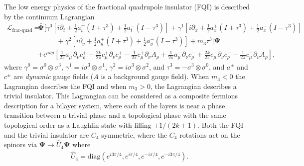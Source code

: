 \documentclass[%
 reprint,
 amsmath,amssymb,
 aps,
]{revtex4-1}
\begin{document}
\begin{appendix}
The low energy physics of the fractional quadrupole insulator (FQI) is described by the continuum Lagrangian 
\begin{equation}\begin{split}
\mathcal{L}_{\text{frac-quad}} = &\bar{\bm{\Psi}} \Big[\gamma^0 [i\partial_t + \frac{1}{2}a^+_t(I + \tau^3) + \frac{1}{2}a^-_t(I - \tau^3)]  + \gamma^1 [i\partial_x + \frac{1}{2}a^+_x(I + \tau^3) + \frac{1}{2}a^-_x(I - \tau^3)]  \\ &\phantom{==}+ \gamma^2 [i\partial_y + \frac{1}{2}a^+_y(I + \tau^3) + \frac{1}{2}a^-_y(I - \tau^3)] + m_3\tau^3 \Big] \bm{\Psi}\\ & + \epsilon^{\mu\nu\rho}\left[\frac{1}{2\pi} a^{+}_\mu \partial_\nu c^{+}_\rho - \frac{2k}{2\pi} c^{+}_\mu \partial_\nu c^{+}_\rho - \frac{1}{2\pi} c^{+}_\mu \partial_\nu A_\rho + \frac{1}{2\pi} a^{-}_\mu \partial_\nu c^{-}_\rho +\frac{2k}{2\pi} c^{-}_\mu \partial_\nu c^{-}_\rho - \frac{1}{2\pi} c^{-}_\mu \partial_\nu A_\rho \right],
\label{Aeq:QIContinuumFracLag}\end{split}\end{equation}
where $\gamma^0 = \sigma^0 \otimes \sigma^3$, $\gamma^1 = i \sigma^3 \otimes \sigma^1$, $\gamma^2 = i \sigma^3 \otimes \sigma^2$, and $\tau^3 = -\sigma^3\otimes \sigma^0$, and $a^\pm$ and $c^{\pm}$ are \textit{dynamic} gauge fields ($A$ is a background gauge field). When $m_3<0$ the Lagrangian describes the FQI and when $m_3>0$, the Lagrangian describes a trivial insulator. This Lagrangian can be considered as a composite fermions description for a bilayer system, where each of the layers is near a phase transition between a trivial phase and a topological phase with the same topological order as a Laughlin state with filling $\pm 1/(2k+1)$. Both the FQI and the trivial insulator are $C_4$ symmetric, where the $C_4$ rotations act on the spinors via $\bm{\Psi} \rightarrow \hat{U}_4 \bm{\Psi}$ where
\begin{equation}\begin{split}
\hat{U}_4 = \text{diag}(e^{i3\pi/4},e^{i\pi/4},e^{-i\pi/4}, e^{-i3\pi/4}).
\label{Aeq:C4SpinorDefFrac}\end{split}\end{equation} 



\end{appendix}
\end{document}
